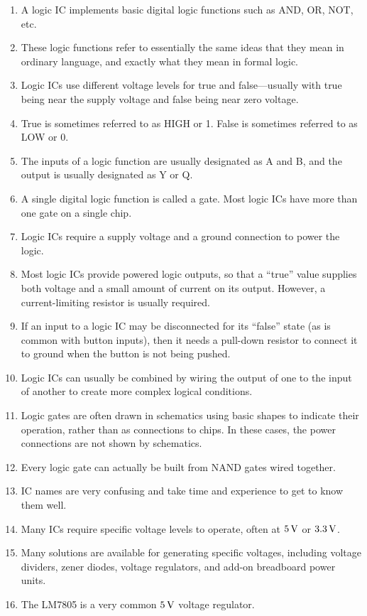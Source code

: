 \begin{enumerate}
\item A logic IC implements basic digital logic functions such as AND, OR, NOT, etc.
\item These logic functions refer to essentially the same ideas that they mean in ordinary language, and exactly what they mean in formal logic.
\item Logic ICs use different voltage levels for true and false---usually with true being near the supply voltage and false being near zero voltage.
\item True is sometimes referred to as HIGH or 1.  False is sometimes referred to as LOW or 0.
\item The inputs of a logic function are usually designated as A and B, and the output is usually designated as Y or Q.
\item A single digital logic function is called a gate.  Most logic ICs have more than one gate on a single chip.
\item Logic ICs require a supply voltage and a ground connection to power the logic.
\item Most logic ICs provide powered logic outputs, so that a ``true'' value supplies both voltage and a small amount of current on its output.  However, a current-limiting resistor is usually required.
\item If an input to a logic IC may be disconnected for its ``false'' state (as is common with button inputs), then it needs a pull-down resistor to connect it to ground when the button is not being pushed.
\item Logic ICs can usually be combined by wiring the output of one to the input of another to create more complex logical conditions.
\item Logic gates are often drawn in schematics using basic shapes to indicate their operation, rather than as connections to chips.  In these cases, the power connections are not shown by schematics.
\item Every logic gate can actually be built from NAND gates wired together.
\item IC names are very confusing and take time and experience to get to know them well.
\item Many ICs require specific voltage levels to operate, often at $5\,\si{\volt}$ or $3.3\,\si{\volt}$.
\item Many solutions are available for generating specific voltages, including voltage dividers, zener diodes, voltage regulators, and add-on breadboard power units.
\item The LM7805 is a very common $5\,\si{\volt}$ voltage regulator.
\end{enumerate}

\applysection


